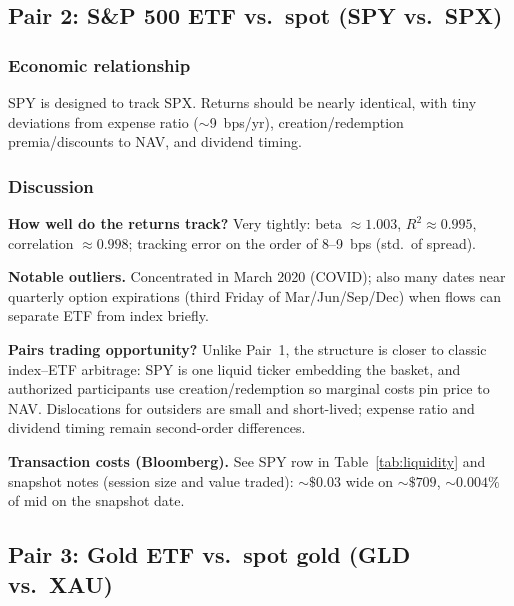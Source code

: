 \subsection{Pair 2: S\&P 500 ETF vs.\ spot (SPY vs.\ SPX)}
\label{subsec:pair2}

\subsubsection*{Economic relationship}
SPY is designed to track SPX. Returns should be nearly identical, with tiny deviations from expense ratio ($\sim$9~bps/yr), creation/redemption premia/discounts to NAV, and dividend timing.


\subsubsection*{Discussion}

\textbf{How well do the returns track?}
Very tightly: beta $\approx 1.003$, $R^2 \approx 0.995$, correlation $\approx 0.998$; tracking error on the order of 8--9~bps (std.\ of spread).

\textbf{Notable outliers.}
Concentrated in March 2020 (COVID); also many dates near quarterly option expirations (third Friday of Mar/Jun/Sep/Dec) when flows can separate ETF from index briefly.

\textbf{Pairs trading opportunity?}
Unlike Pair~1, the structure is closer to classic index--ETF arbitrage: SPY is one liquid ticker embedding the basket, and authorized participants use creation/redemption so marginal costs pin price to NAV. Dislocations for outsiders are small and short-lived; expense ratio and dividend timing remain second-order differences.

\textbf{Transaction costs (Bloomberg).}
See SPY row in Table~\ref{tab:liquidity} and snapshot notes (session size and value traded): $\sim\$0.03$ wide on $\sim\$709$, $\sim 0.004\%$ of mid on the snapshot date.

\subsection{Pair 3: Gold ETF vs.\ spot gold (GLD vs.\ XAU)}
\label{subsec:pair3}

